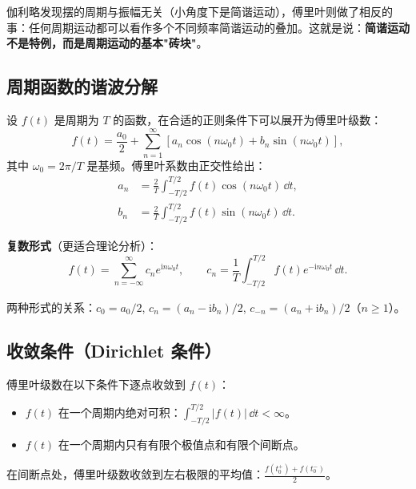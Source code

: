 伽利略发现摆的周期与振幅无关（小角度下是简谐运动），傅里叶则做了相反的事：任何周期运动都可以看作多个不同频率简谐运动的叠加。这就是说：\textbf{简谐运动不是特例，而是周期运动的基本"砖块"}。

\subsection{周期函数的谐波分解}

设 $f(t)$ 是周期为 $T$ 的函数，在合适的正则条件下可以展开为傅里叶级数：
\begin{equation}
f(t) = \frac{a_0}{2} + \sum_{n=1}^{\infty}
\left[a_n\cos(n\omega_0 t) + b_n\sin(n\omega_0 t)\right],
\label{eq:fourier_series_tri}
\end{equation}
其中 $\omega_0 = 2\pi/T$ 是基频。傅里叶系数由正交性给出：
\begin{align}
a_n &= \frac{2}{T}\int_{-T/2}^{T/2} f(t)\cos(n\omega_0 t)\,\dd t,\\
b_n &= \frac{2}{T}\int_{-T/2}^{T/2} f(t)\sin(n\omega_0 t)\,\dd t.
\end{align}

\textbf{复数形式}（更适合理论分析）：
\begin{equation}
f(t) = \sum_{n=-\infty}^{\infty} c_n e^{\mathrm{i}n\omega_0 t},
\qquad
c_n = \frac{1}{T}\int_{-T/2}^{T/2} f(t)e^{-\mathrm{i}n\omega_0 t}\,\dd t.
\label{eq:fourier_series_complex}
\end{equation}

两种形式的关系：$c_0 = a_0/2$, $c_n = (a_n - \mathrm{i}b_n)/2$, $c_{-n} = (a_n + \mathrm{i}b_n)/2$（$n\geq1$）。

\subsection{收敛条件（Dirichlet 条件）}

傅里叶级数在以下条件下逐点收敛到 $f(t)$：
\begin{itemize}
\item $f(t)$ 在一个周期内绝对可积：$\int_{-T/2}^{T/2} |f(t)|\,\dd t < \infty$。
\item $f(t)$ 在一个周期内只有有限个极值点和有限个间断点。
\end{itemize}
在间断点处，傅里叶级数收敛到左右极限的平均值：$\frac{f(t_0^+) + f(t_0^-)}{2}$。

